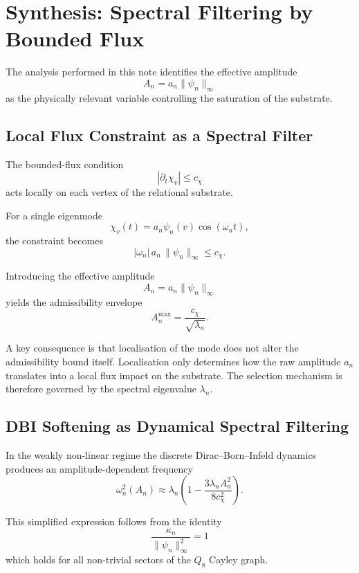 \documentclass[11pt,a4paper]{article}
\begin{document}
  \section{Synthesis: Spectral Filtering by Bounded Flux}

    The analysis performed in this note identifies the effective amplitude
    \[
      A_n = a_n \|\psi_n\|_\infty
    \]
    as the physically relevant variable controlling the saturation of the
    substrate.

    \subsection{Local Flux Constraint as a Spectral Filter}

      The bounded-flux condition
      \[
        |\partial_t \chi_v| \le c_\chi
      \]
      acts locally on each vertex of the relational substrate.

      For a single eigenmode
      \[
        \chi_v(t) = a_n \psi_n(v) \cos(\omega_n t),
      \]
      the constraint becomes
      \[
        |\omega_n|\,a_n\,\|\psi_n\|_\infty \le c_\chi.
      \]

      Introducing the effective amplitude
      \[
        A_n = a_n \|\psi_n\|_\infty
      \]
      yields the admissibility envelope
      \[
        A_n^{\max} = \frac{c_\chi}{\sqrt{\lambda_n}}.
      \]

      A key consequence is that localisation of the mode does not alter the
      admissibility bound itself.
      Localisation only determines how the raw amplitude $a_n$ translates into
      a local flux impact on the substrate.
      The selection mechanism is therefore governed by the spectral
      eigenvalue $\lambda_n$.

    \subsection{DBI Softening as Dynamical Spectral Filtering}

      In the weakly non-linear regime the discrete Dirac--Born--Infeld dynamics
      produces an amplitude-dependent frequency
      \[
        \omega_n^2(A_n)
        \approx
        \lambda_n
        \left(
          1 -
          \frac{3\lambda_n A_n^2}{8c_\chi^2}
        \right).
      \]

      This simplified expression follows from the identity
      \[
        \frac{\kappa_n}{\|\psi_n\|_\infty^2}=1
      \]
      which holds for all non-trivial sectors of the $Q_8$ Cayley graph.
\end{document}
